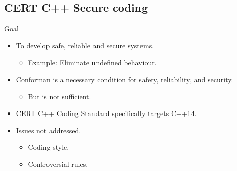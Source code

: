 \subsection{CERT C++ Secure coding}

\begin{frame}[t]{Goal}
\begin{itemize}
  \item To develop safe, reliable and secure systems.
    \begin{itemize}
      \item Example: Eliminate undefined behaviour.
    \end{itemize}

  \vfill
  \item Conforman is a necessary condition for safety, reliability, and security.
    \begin{itemize}
      \item But is not sufficient.
    \end{itemize}

  \vfill
  \item CERT C++ Coding Standard specifically targets C++14.

  \vfill
  \item Issues not addressed.
    \begin{itemize}
      \item Coding style.
      \item Controversial rules.
    \end{itemize}
\end{itemize}
\end{frame}

